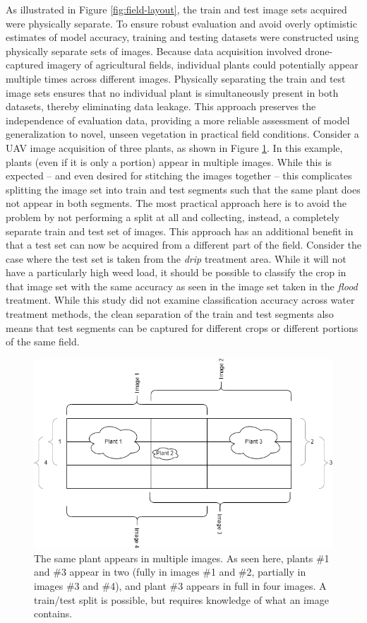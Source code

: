 \documentclass[letterpaper, notitlepage]{report}
\begin{document}
As illustrated in Figure \ref{fig:field-layout}, the train and test image sets acquired were physically separate. To ensure robust evaluation and avoid overly optimistic estimates of model accuracy, training and testing datasets were constructed using physically separate sets of images. Because data acquisition involved drone-captured imagery of agricultural fields, individual plants could potentially appear multiple times across different images. Physically separating the train and test image sets ensures that no individual plant is simultaneously present in both datasets, thereby eliminating data leakage. This approach preserves the independence of evaluation data, providing a more reliable assessment of model generalization to novel, unseen vegetation in practical field conditions. Consider a \gls{UAV} image acquisition of three plants, as shown in Figure \ref{fig:uav-overlap}. In this example, plants (even if it is only a portion) appear in multiple images. While this is expected -- and even desired for stitching the images together -- this complicates splitting the image set into train and test segments such that the same plant does not appear in both segments. The most practical approach here is to  avoid the problem by not performing a split at all and collecting, instead, a completely separate train and test set of images. This approach has an additional benefit in that a test set can now be acquired from a different part of the field. Consider the case where the test set is taken from the \textit{drip} treatment area. While it will not have a particularly high weed load, it should be possible to classify the crop in that image set with the same accuracy as seen in the image set taken in the \textit{flood} treatment. While this study did not examine classification accuracy across water treatment methods, the clean separation of the train and test segments also means that test segments can be captured for different crops or different portions of the same field.

\begin{figure}[h!]
	\centering
	\includegraphics[width=0.9\linewidth]{./figures/overlap.png}
	\caption[Image overlap in \gls{UAV} images]{The same plant appears in multiple images. As seen here, plants \#1 and \#3 appear in two (fully in images \#1 and \#2, partially in images \#3 and \#4), and plant \#3 appears in full in four images. A train/test split is possible, but requires knowledge of what an image contains.}
	\label{fig:uav-overlap}
\end{figure}
\end{document}
